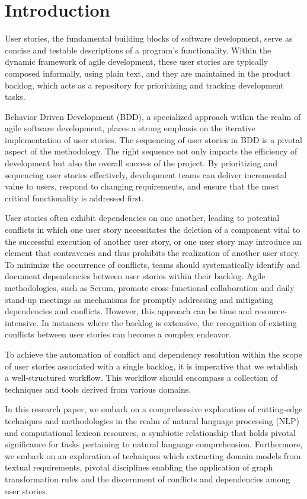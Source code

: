\section{Introduction}
User stories, the fundamental building blocks of software development, serve as concise and testable descriptions of a program's functionality. Within the dynamic framework of agile development, these user stories are typically composed informally, using plain text, and they are maintained in the product backlog, which acts as a repository for prioritizing and tracking development tasks.

Behavior Driven Development (BDD), a specialized approach within the realm of agile software development, places a strong emphasis on the iterative implementation of user stories. The sequencing of user stories in BDD is a pivotal aspect of the methodology. The right sequence not only impacts the efficiency of development but also the overall success of the project. By prioritizing and sequencing user stories effectively, development teams can deliver incremental value to users, respond to changing requirements, and ensure that the most critical functionality is addressed first.

User stories often exhibit dependencies on one another, leading to potential conflicts in which one user story necessitates the deletion of a component vital to the successful execution of another user story, or one user story may introduce an element that contravenes and thus prohibits the realization of another user story. To minimize the occurrence of conflicts, teams should systematically identify and document dependencies between user stories within their backlog. Agile methodologies, such as Scrum, promote cross-functional collaboration and daily stand-up meetings as mechanisms for promptly addressing and mitigating dependencies and conflicts. However, this approach can be time and resource-intensive. In instances where the backlog is extensive, the recognition of existing conflicts between user stories can become a complex endeavor.

To achieve the automation of conflict and dependency resolution within the scope of user stories associated with a single backlog, it is imperative that we establish a well-structured workflow. This workflow should encompass a collection of techniques and tools derived from various domains. 

In this research paper, we embark on a comprehensive exploration of cutting-edge techniques and methodologies in the realm of natural language processing (NLP) and computational lexicon resources, a symbiotic relationship that holds pivotal significance for tasks pertaining to natural language comprehension. Furthermore, we embark on an exploration of techniques which extracting domain models from textual requirements, pivotal disciplines enabling the application of graph transformation rules and the discernment of conflicts and dependencies among user stories.


